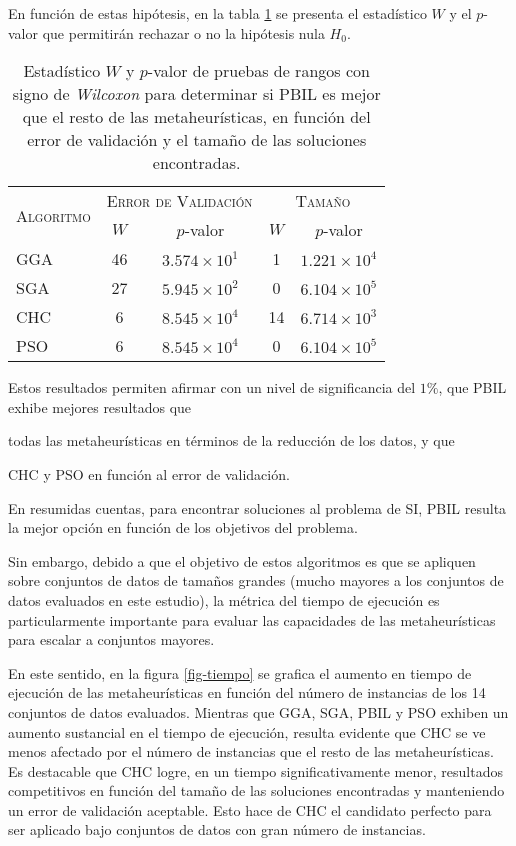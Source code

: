 En función de estas hipótesis, en la tabla \ref{wilcox-res-pbil} se presenta el estadístico $W$ y el $p$-valor que permitirán rechazar o no la hipótesis nula $H_0$.

\begin{table}[h!]
\centering
\begin{tabular}{l c c c c}
\hline
\multirow{2}{*}{\textsc{Algoritmo}}
	& \multicolumn{2}{c}{\textsc{Error de Validación}}
	& \multicolumn{2}{c}{\textsc{Tamaño}} \\\cline{2-5}
 & $W$ & $p$-valor & $W$ & $p$-valor \\
\hline
\hline
GGA & 46 & $3.574 \times 10^1$ &  1 & $1.221 \times 10^4$ \\
SGA & 27 & $5.945 \times 10^2$ &  0 & $6.104 \times 10^5$ \\
CHC &  6 & $8.545 \times 10^4$ & 14 & $6.714 \times 10^3$ \\
PSO &  6 & $8.545 \times 10^4$ &  0 & $6.104 \times 10^5$ \\
\hline
\end{tabular}
\caption[Pruebas de \emph{Wilcoxon} comparando PBIL]{Estadístico $W$ y $p$-valor de pruebas de rangos con signo de \emph{Wilcoxon} para determinar si PBIL es mejor que el resto de las metaheurísticas, en función del error de validación y el tamaño de las soluciones encontradas.}
\label{wilcox-res-pbil}
\end{table}

Estos resultados permiten afirmar con un nivel de significancia del $1\%$, que PBIL exhibe mejores resultados que
\begin{inparaenum}
\item todas las metaheurísticas en términos de la reducción de los datos, y que
\item CHC y PSO en función al error de validación.
\end{inparaenum}
En resumidas cuentas, para encontrar soluciones al problema de SI, PBIL resulta la mejor opción en función de los objetivos del problema.

Sin embargo, debido a que el objetivo de estos algoritmos es que se apliquen sobre conjuntos de datos de tamaños grandes (mucho mayores a los conjuntos de datos evaluados en este estudio), la métrica del tiempo de ejecución es particularmente importante para evaluar las capacidades de las metaheurísticas para escalar a conjuntos mayores.

En este sentido, en la figura \ref{fig-tiempo} se grafica el aumento en tiempo de ejecución de las metaheurísticas en función del número de instancias de los 14 conjuntos de datos evaluados. Mientras que GGA, SGA, PBIL y PSO exhiben un aumento sustancial en el tiempo de ejecución, resulta evidente que CHC se ve menos afectado por el número de instancias que el resto de las metaheurísticas. Es destacable que CHC logre, en un tiempo significativamente menor, resultados competitivos en función del tamaño de las soluciones encontradas y manteniendo un error de validación aceptable. Esto hace de CHC el candidato perfecto para ser aplicado bajo conjuntos de datos con gran número de instancias.

